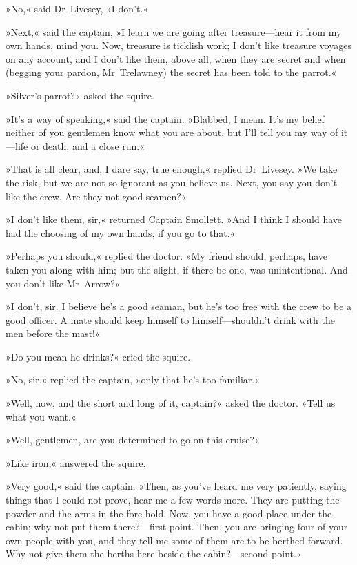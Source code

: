 »No,« said Dr~Livesey, »I don't.«

»Next,« said the captain, »I learn we are going after treasure—hear it from my own hands, mind you. Now, treasure is ticklish work; I don't like treasure voyages on any account, and I don't like them, above all, when they are secret and when (begging your pardon, Mr~Trelawney) the secret has been told to the parrot.«

»Silver's parrot?« asked the squire.

»It's a way of speaking,« said the captain. »Blabbed, I mean. It's my belief neither of you gentlemen know what you are about, but I'll tell you my way of it—life or death, and a close run.«

»That is all clear, and, I dare say, true enough,« replied Dr~Livesey. »We take the risk, but we are not so ignorant as you believe us. Next, you say you don't like the crew. Are they not good seamen?«

»I don't like them, sir,« returned Captain Smollett. »And I think I should have had the choosing of my own hands, if you go to that.«

»Perhaps you should,« replied the doctor. »My friend should, perhaps, have taken you along with him; but the slight, if there be one, was unintentional. And you don't like Mr~Arrow?«

»I don't, sir. I believe he's a good seaman, but he's too free with the crew to be a good officer. A mate should keep himself to himself—shouldn't drink with the men before the mast!«

»Do you mean he drinks?« cried the squire.

»No, sir,« replied the captain, »only that he's too familiar.«

»Well, now, and the short and long of it, captain?« asked the doctor. »Tell us what you want.«

»Well, gentlemen, are you determined to go on this cruise?«

»Like iron,« answered the squire.

»Very good,« said the captain. »Then, as you've heard me very patiently, saying things that I could not prove, hear me a few words more. They are putting the powder and the arms in the fore hold. Now, you have a good place under the cabin; why not put them there?—first point. Then, you are bringing four of your own people with you, and they tell me some of them are to be berthed forward. Why not give them the berths here beside the cabin?—second point.«

